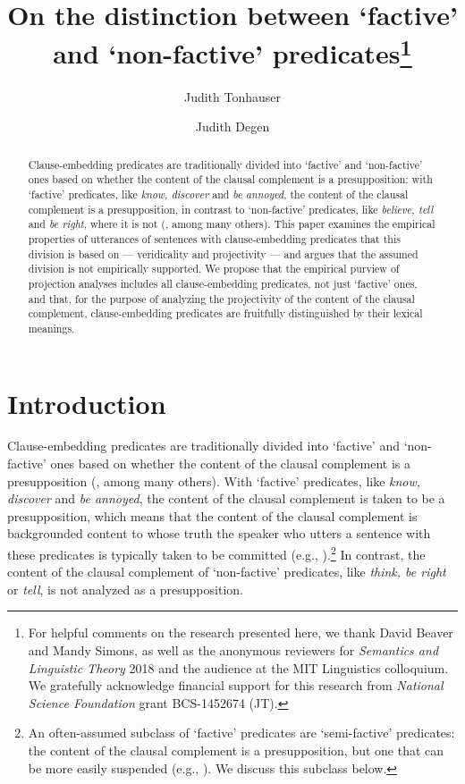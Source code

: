 \documentclass[11pt,fleqn]{article}
\title{On the distinction between `factive' and `non-factive' predicates\thanks{For helpful comments on the research presented here, we thank David Beaver and Mandy Simons, as well as the anonymous reviewers for {\em Semantics and Linguistic Theory} 2018 and the audience at the MIT Linguistics colloquium. We gratefully acknowledge financial support for this research from {\em National Science Foundation} grant BCS-1452674 (JT).}}
\author[$\circ$]{Judith Tonhauser}
\author[$\bullet$]{Judith Degen}
\affil[$\circ$]{The Ohio State University}
\affil[$\bullet$]{Stanford University}
\newcommand{\6}{\mbox{$[\hspace*{-.6mm}[$}}
\newcommand{\9}{\mbox{$]\hspace*{-.6mm}]$}}
\begin{document}

\maketitle


\begin{abstract}

Clause-embedding predicates are traditionally divided into `factive' and `non-factive' ones based on whether the content of the clausal complement is a presupposition: with `factive' predicates, like {\em know, discover} and {\em be annoyed}, the content of the clausal complement is a presupposition, in contrast to `non-factive' predicates, like {\em believe, tell} and {\em be right}, where it is not  (\citealt{kiparsky-kiparsky71,karttunen71b,vds92,beaver-geurts-sep}, among many others). This paper examines the empirical properties of utterances of sentences with clause-embedding predicates that this division is based on --- veridicality and projectivity --- and argues that the assumed division is not empirically supported. We propose that the empirical purview of projection analyses includes all clause-embedding predicates, not just `factive' ones, and that, for the purpose of analyzing the projectivity of the content of the clausal complement, clause-embedding predicates are  fruitfully distinguished by their lexical meanings.

\end{abstract}
			
\section{Introduction}\label{s1}

Clause-embedding predicates are traditionally divided into `factive' and `non-factive'  ones based on whether the content of the clausal complement is a presupposition (\citealt{kiparsky-kiparsky71,karttunen71b,vds92,beaver-geurts-sep}, among many others). With `factive' predicates, like {\em know, discover} and {\em be annoyed}, the content of the clausal complement is taken to be a presupposition, which means that the content of the clausal complement is backgrounded content to whose truth the speaker who utters a sentence with these predicates is typically taken to be committed (e.g., \citealt{stalnaker74,ccmg90}).\footnote{An often-assumed subclass of `factive' predicates are `semi-factive' predicates: the content of the clausal complement is a presupposition, but one that can be more easily suspended (e.g., \citealt{karttunen71b}). We discuss this subclass below.} In contrast, the content of the clausal complement of `non-factive' predicates, like {\em think, be right} or {\em tell}, is not analyzed as a presupposition. 
\end{document}
